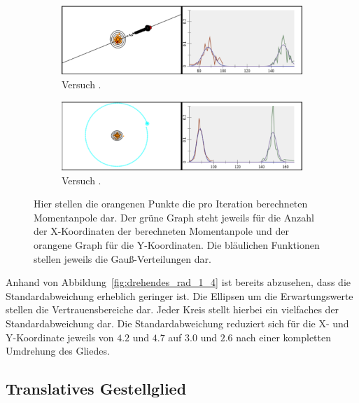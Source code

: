 \begin{figure}
    \centering
    \begin{subfigure}[t]{0.45\textwidth}
        \includegraphics[width=\textwidth]{gfx/drehendes_pendel_1.png}
        \caption{Versuch .}\label{fig:drehendes_pendel_1}
    \end{subfigure}
    \begin{subfigure}[t]{0.45\textwidth}
        \includegraphics[width=\textwidth]{gfx/drehendes_pendel_4.png}
        \caption{Versuch .}\label{fig:drehendes_pendel_4}
    \end{subfigure}
    \caption[Versuche  und ]{Hier stellen die orangenen Punkte die pro Iteration berechneten Momentanpole dar. Der grüne Graph steht jeweils für die Anzahl der X-Koordinaten der berechneten Momentanpole und der orangene Graph für die Y-Koordinaten. Die bläulichen Funktionen stellen jeweils die Gauß-Verteilungen dar.}
    \label{fig:drehendes_pendel_1_4}
\end{figure}

Anhand von Abbildung~\ref{fig:drehendes_rad_1_4} ist bereits abzusehen, dass die Standardabweichung erheblich geringer ist.
Die Ellipsen um die Erwartungswerte stellen die Vertrauensbereiche dar.
Jeder Kreis stellt hierbei ein vielfaches der Standardabweichung dar.
Die Standardabweichung reduziert sich für die X- und Y-Koordinate jeweils von $4.2$ und $4.7$ auf $3.0$ und $2.6$ nach einer kompletten Umdrehung des Gliedes. 

\subsection{Translatives Gestellglied}

